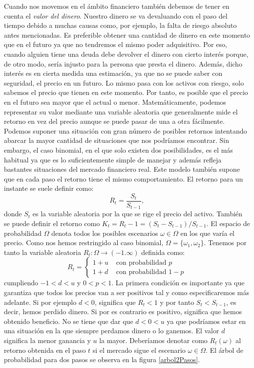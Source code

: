Cuando nos movemos en el ámbito financiero también debemos de tener en cuenta el \textit{valor del dinero}. Nuestro dinero se va devaluando con el paso del tiempo debido a muchas causas como, por ejemplo, la falta de riesgo absoluto antes mencionadas. Es preferible obtener una cantidad de dinero en este momento que en el futuro ya que no tendremos el mismo poder adquisitivo. Por eso, cuando alguien tiene una deuda debe devolver el dinero con cierto interés porque, de otro modo, sería injusto para la persona que presta el dinero. Además, dicho interés es en cierta medida una estimación, ya que no se puede saber con seguridad, el precio en un futuro. Lo mismo pasa con los activos con riesgo, solo sabemos el precio que tienen en este momento. Por tanto, es posible que el precio en el futuro sea mayor que el actual o menor. Matemáticamente, podemos representar su valor mediante una variable aleatoria que generalmente mide el retorno en vez del precio aunque se puede pasar de una a otra fácilmente. Podemos suponer una situación con gran número de posibles retornos intentando abarcar la mayor cantidad de situaciones que nos podríamos encontrar. Sin embargo, el caso binomial, en el que solo existen dos posibilidades, es el más habitual ya que es lo suficientemente simple de manejar y además refleja bastantes situaciones del mercado financiero real. Este modelo también supone que en cada paso el retorno tiene el mismo comportamiento. El retorno para un instante se suele definir como:
\[
R_t = \frac{S_t}{S_{t-1}},
\]
donde $ S_t $ es la variable aleatoria por la que se rige el precio del activo. También se puede definir el retorno como $ K_t = R_t - 1 = (S_t-S_{t-1})/S_{t-1}$. El espacio de probabilidad $ \Omega $ denota todos los posibles escenarios $ \omega \in \Omega $ en los que varía el precio. Como nos hemos restringido al caso binomial, $ \Omega = \{ \omega_1, \omega_2\} $. Tenemos por tanto la variable aleatoria $ R_t:\Omega \longrightarrow (-1.\infty) $ definida como:
\[
R_t = \begin{cases}
1+ u & \text{ con probabilidad } p\\
1+ d & \text{ con probabilidad } 1-p
\end{cases}
\]
cumpliendo $ -1 < d < u $ y $ 0 < p <1 $. La primera condición es importante ya que garantiza que todos los precios van a ser positivos tal y como especificaremos más adelante. Si por ejemplo $ d < 0 $, significa que $ R_t < 1 $ y por tanto $ S_t < S_{t-1} $, es decir, hemos perdido dinero. Si por es contrario es positivo, significa que hemos obtenido beneficio. No se tiene que dar que $ d < 0 < u$ ya que podríamos estar en una situación en la que siempre perdamos dinero o lo ganemos. El valor $ d $ significa la menor ganancia y $ u $ la mayor. Deberíamos denotar como $ R_t(\omega) $ al retorno obtenida en el paso $ t $ si el mercado sigue el escenario $ \omega \in \Omega $. El árbol de probabilidad para dos pasos se observa en la figura \ref{arbol2Pasos}. \\


